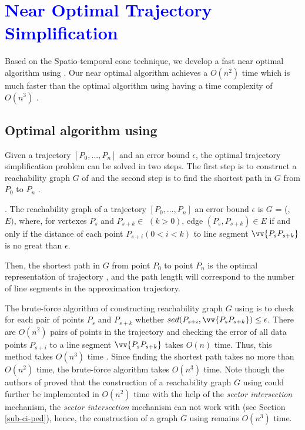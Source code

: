 \section{\textcolor{blue}{Near Optimal Trajectory Simplification}}
\label{sec-optimal}

Based on the Spatio-temporal cone technique, we develop a fast near optimal algorithm using \sed. Our near optimal algorithm achieves a $O(n^2)$ time which is much faster than the optimal algorithm using \sed having a time complexity of $O(n^3)$ \cite{Imai:Optimal}.


\subsection{Optimal algorithm using \sed}

Given a trajectory ${[P_0, \ldots, P_n]}$ and an error bound $\epsilon$, the optimal trajectory simplification problem can be solved in two steps. 
The first step is to construct a reachability graph $G$ of  and the second step is to find the shortest path in $G$ from $P_0$ to $P_{n}$ \cite{Imai:Optimal, Chan:Optimal}.

. The reachability graph of a trajectory ${[P_0, \ldots, P_n]}$ \wrt an error bound $\epsilon$ is $G$
= (, $E)$, where, for vertexes $P_s$ and $P_{s+k} \in$  $(k>0)$, edge $(P_s, P_{s+k}) \in E$ if and only if the distance of each point $P_{s+i} (0<i<k)$ to line segment $\vv{P_sP_{s+k}}$ is no great than $\epsilon$.

Then, the shortest path in $G$ from point $P_0$ to point $P_{n}$ is the optimal representation of trajectory , and the path length will correspond to the number of line segments in the approximation trajectory. 


The brute-force algorithm of constructing reachability graph $G$ using \sed is to check for each pair of points $P_s$ and $P_{s+k}$ whether $sed(P_{s+i}, \vv{P_sP_{s+k}}) \le \epsilon$. 
There are $O(n^2)$ pairs of points in the trajectory and checking the error of all data points $P_{s+i}$ to a line segment $\vv{P_sP_{s+k}}$ takes $O(n)$ time. 
Thus, this method takes $O(n^3)$ time \cite{Imai:Optimal}. 
Since finding the shortest path takes no more than $O(n^2)$ time, the brute-force algorithm takes $O(n^3)$ time.
%
Note though the authors of \cite{Chan:Optimal} proved that the construction of a reachability graph $G$ using \ped could further be implemented in $O(n^2)$ time with the help of the \textit{sector intersection} mechanism, the \textit{sector intersection} mechanism can not work with \sed (see Section \ref{sub-ci-ped}), hence, the construction of a graph  $G$ using \sed remains $O(n^3)$ time.

